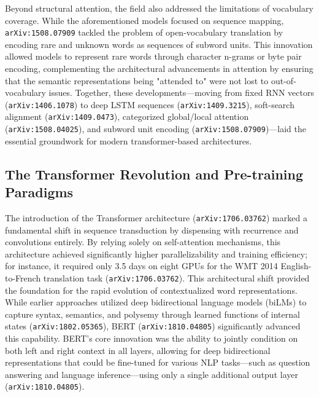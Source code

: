 \documentclass[11pt]{article}
\begin{document}
Beyond structural attention, the field also addressed the limitations of vocabulary coverage. While the aforementioned models focused on sequence mapping, \texttt{arXiv:1508.07909} tackled the problem of open-vocabulary translation by encoding rare and unknown words as sequences of subword units. This innovation allowed models to represent rare words through character n-grams or byte pair encoding, complementing the architectural advancements in attention by ensuring that the semantic representations being "attended to" were not lost to out-of-vocabulary issues. Together, these developments—moving from fixed RNN vectors (\texttt{arXiv:1406.1078}) to deep LSTM sequences (\texttt{arXiv:1409.3215}), soft-search alignment (\texttt{arXiv:1409.0473}), categorized global/local attention (\texttt{arXiv:1508.04025}), and subword unit encoding (\texttt{arXiv:1508.07909})—laid the essential groundwork for modern transformer-based architectures.

\subsection{The Transformer Revolution and Pre-training Paradigms}

The introduction of the Transformer architecture (\texttt{arXiv:1706.03762}) marked a fundamental shift in sequence transduction by dispensing with recurrence and convolutions entirely. By relying solely on self-attention mechanisms, this architecture achieved significantly higher parallelizability and training efficiency; for instance, it required only 3.5 days on eight GPUs for the WMT 2014 English-to-French translation task (\texttt{arXiv:1706.03762}). This architectural shift provided the foundation for the rapid evolution of contextualized word representations. While earlier approaches utilized deep bidirectional language models (biLMs) to capture syntax, semantics, and polysemy through learned functions of internal states (\texttt{arXiv:1802.05365}), BERT (\texttt{arXiv:1810.04805}) significantly advanced this capability. BERT's core innovation was the ability to jointly condition on both left and right context in all layers, allowing for deep bidirectional representations that could be fine-tuned for various NLP tasks—such as question answering and language inference—using only a single additional output layer (\texttt{arXiv:1810.04805}).
\end{document}
